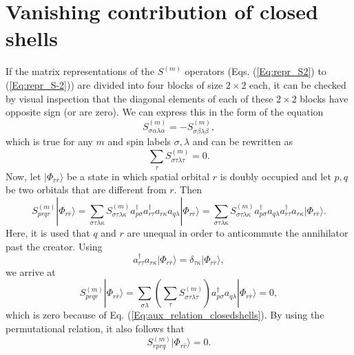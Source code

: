 \section{Vanishing contribution of closed shells}
\label{Ap:closedshells}
If the matrix representations of the ${S^{(m)}}$ operators (Eqs. (\ref{Eq:repr_S2}) to (\ref{Eq:repr_S-2})) are divided into four blocks of size $2 \times 2$ each, it can be checked by visual inspection that the diagonal elements of each of these $2 \times 2$ blocks have opposite sign (or are zero). We can express this in the form of the equation
	\begin{equation}
	S_{\sigma \alpha \lambda \alpha }^{(m)} =  - S_{\sigma \beta \lambda \beta }^{(m)},
	\end{equation} 	
which is true for any $m$ and spin labels $\sigma ,\lambda $ and can be rewritten as
	\begin{equation}
	\label{Eq:aux_relation_closedshells}
	\sum\limits_\tau  {S_{\sigma \tau \lambda \tau }^{(m)}}  = 0.
	\end{equation} 	
Now, let $|{\Phi _{r\bar r}}\rangle $ be a state in which spatial orbital $r$ is doubly occupied and let $p,q$ be two orbitals that are different from $r$. Then
	\begin{equation}
	S_{prqr}^{(m)}|{\Phi _{r\bar r}}\rangle  = \sum\limits_{\sigma \tau \lambda \kappa } {S_{\sigma \tau \lambda \kappa }^{(m)}} a_{p\sigma }^\dag a_{r\tau }^\dag {a_{r\kappa }}{a_{q\lambda }}|{\Phi _{r\bar r}}\rangle  = \sum\limits_{\sigma \tau \lambda \kappa } {S_{\sigma \tau \lambda \kappa }^{(m)}} a_{p\sigma }^\dag {a_{q\lambda }}a_{r\tau }^\dag {a_{r\kappa }}|{\Phi _{r\bar r}}\rangle. 
	\end{equation} 	
Here, it is used that $q$ and $r$ are unequal in order to anticommute the annihilator past the creator. Using
	\begin{equation}
	a_{r\tau }^\dag {a_{r\kappa }}|{\Phi _{r\bar r}}\rangle  = {\delta _{\tau \kappa }}|{\Phi _{r\bar r}}\rangle, 
	\end{equation} 	
we arrive at
	\begin{equation}
	S_{prqr}^{(m)}|{\Phi _{r\bar r}}\rangle  = \sum\limits_{\sigma \lambda } {\left( {\sum\limits_\tau  {S_{\sigma \tau \lambda \tau }^{(m)}} } \right)} a_{p\sigma }^\dag {a_{q\lambda }}|{\Phi _{r\bar r}}\rangle  = 0,
	\end{equation} 	
which is zero because of Eq. (\ref{Eq:aux_relation_closedshells}). By using the permutational relation, it also follows that
	\begin{equation}
	S_{rprq}^{(m)}|{\Phi _{r\bar r}}\rangle  = 0.
	\end{equation} 	
